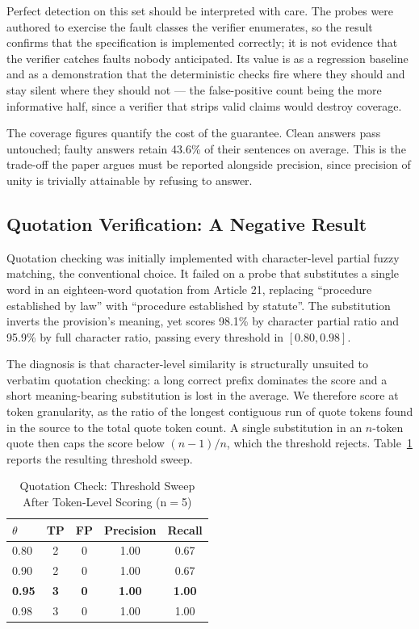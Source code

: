 \documentclass[conference]{IEEEtran}
\begin{document}
Perfect detection on this set should be interpreted with care. The probes were
authored to exercise the fault classes the verifier enumerates, so the result
confirms that the specification is implemented correctly; it is not evidence
that the verifier catches faults nobody anticipated. Its value is as a
regression baseline and as a demonstration that the deterministic checks fire
where they should and stay silent where they should not --- the false-positive
count being the more informative half, since a verifier that strips valid
claims would destroy coverage.

The coverage figures quantify the cost of the guarantee. Clean answers pass
untouched; faulty answers retain 43.6\% of their sentences on average. This is
the trade-off the paper argues must be reported alongside precision, since
precision of unity is trivially attainable by refusing to answer.

\subsection{Quotation Verification: A Negative Result}

Quotation checking was initially implemented with character-level partial
fuzzy matching, the conventional choice. It failed on a probe that substitutes
a single word in an eighteen-word quotation from Article 21, replacing
``procedure established by law'' with ``procedure established by statute''. The
substitution inverts the provision's meaning, yet scores 98.1\% by character
partial ratio and 95.9\% by full character ratio, passing every threshold in
$[0.80, 0.98]$.

The diagnosis is that character-level similarity is structurally unsuited to
verbatim quotation checking: a long correct prefix dominates the score and a
short meaning-bearing substitution is lost in the average. We therefore score at
token granularity, as the ratio of the longest contiguous run of quote tokens
found in the source to the total quote token count. A single substitution in an
$n$-token quote then caps the score below $(n-1)/n$, which the threshold
rejects. Table~\ref{tab:theta} reports the resulting threshold sweep.

\begin{table}[t]
\caption{Quotation Check: Threshold Sweep After Token-Level Scoring (n$=$5)}
\label{tab:theta}
\centering
\footnotesize
\begin{tabular}{@{}lcccc@{}}
\toprule
$\theta$ & TP & FP & Precision & Recall \\
\midrule
0.80 & 2 & 0 & 1.00 & 0.67 \\
0.90 & 2 & 0 & 1.00 & 0.67 \\
\textbf{0.95} & \textbf{3} & \textbf{0} & \textbf{1.00} & \textbf{1.00} \\
0.98 & 3 & 0 & 1.00 & 1.00 \\
\bottomrule
\end{tabular}
\end{table}
\end{document}
